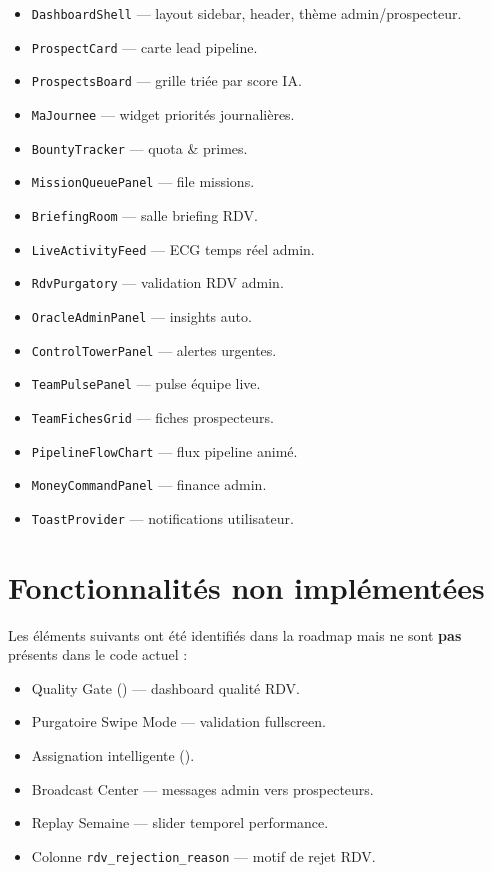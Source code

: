 \documentclass[11pt,a4paper]{report}
\begin{document}
\begin{itemize}[noitemsep]
  \item \texttt{DashboardShell} --- layout sidebar, header, thème admin/prospecteur.
  \item \texttt{ProspectCard} --- carte lead pipeline.
  \item \texttt{ProspectsBoard} --- grille triée par score IA.
  \item \texttt{MaJournee} --- widget priorités journalières.
  \item \texttt{BountyTracker} --- quota \& primes.
  \item \texttt{MissionQueuePanel} --- file missions.
  \item \texttt{BriefingRoom} --- salle briefing RDV.
  \item \texttt{LiveActivityFeed} --- ECG temps réel admin.
  \item \texttt{RdvPurgatory} --- validation RDV admin.
  \item \texttt{OracleAdminPanel} --- insights auto.
  \item \texttt{ControlTowerPanel} --- alertes urgentes.
  \item \texttt{TeamPulsePanel} --- pulse équipe live.
  \item \texttt{TeamFichesGrid} --- fiches prospecteurs.
  \item \texttt{PipelineFlowChart} --- flux pipeline animé.
  \item \texttt{MoneyCommandPanel} --- finance admin.
  \item \texttt{ToastProvider} --- notifications utilisateur.
\end{itemize}

\chapter{Fonctionnalités non implémentées}

Les éléments suivants ont été identifiés dans la roadmap mais ne sont \textbf{pas} présents dans le code actuel :

\begin{itemize}
  \item Quality Gate () --- dashboard qualité RDV.
  \item Purgatoire Swipe Mode --- validation fullscreen.
  \item Assignation intelligente ().
  \item Broadcast Center --- messages admin vers prospecteurs.
  \item Replay Semaine --- slider temporel performance.
  \item Colonne \texttt{rdv\_rejection\_reason} --- motif de rejet RDV.
\end{itemize}
\end{document}
